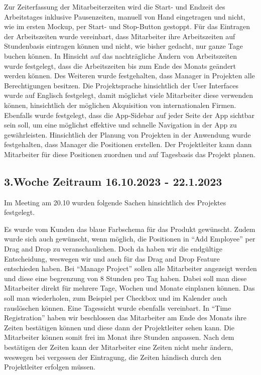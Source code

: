 \documentclass{article}
\begin{document}
Zur Zeiterfassung der Mitarbeiterzeiten wird die Start- und Endzeit des
Arbeitstages inklusive Pausenzeiten, manuell von Hand eingetragen und nicht,
wie im ersten Mockup, per Start- und Stop-Button gestoppt. Für das Eintragen
der Arbeitszeiten wurde vereinbart, dass Mitarbeiter ihre Arbeitszeiten auf
Stundenbasis eintragen können und nicht, wie bisher gedacht, nur ganze Tage
buchen können. In Hinsicht auf das nachträgliche Ändern von Arbeitszeiten wurde
festgelegt, dass die Arbeitszeiten bis zum Ende des Monats geändert werden
können. Des Weiteren wurde festgehalten, dass Manager in Projekten alle
Berechtigungen besitzen. Die Projektsprache hinsichtlich der User Interfaces
wurde auf Englisch festgelegt, damit möglichst viele Mitarbeiter diese
verwenden können, hinsichtlich der möglichen Akquisition von internationalen
Firmen. Ebenfalls wurde festgelegt, dass die App-Sidebar auf jeder Seite der
App sichtbar sein soll, um eine möglichst effektive und schnelle Navigation in
der App zu gewährleisten. Hinsichtlich der Planung von Projekten in der
Anwendung wurde festgehalten, dass Manager die Positionen erstellen. Der
Projektleiter kann dann Mitarbeiter für diese Positionen zuordnen und auf
Tagesbasis das Projekt planen.

\subsection{3.Woche Zeitraum 16.10.2023 - 22.1.2023}
Im Meeting am 20.10 wurden folgende Sachen hinsichtlich des Projektes
festgelegt.

Es wurde vom Kunden das blaue Farbschema für das Produkt gewünscht. Zudem wurde
sich auch gewünscht, wenn möglich, die Positionen in “Add Employee” per Drag
and Drop zu veranschaulichen. Doch da haben wir die endgültige Entscheidung,
weswegen wir und auch für das Drag and Drop Feature entschieden haben. Bei
“Manage Project” sollen alle Mitarbeiter angezeigt werden und diese eine
begrenzung von 8 Stunden pro Tag haben. Dabei soll man diese Mitarbeiter direkt
für mehrere Tage, Wochen und Monate einplanen können. Das soll man wiederholen,
zum Beispiel per Checkbox und im Kalender auch rauslöschen können. Eine
Tagessicht wurde ebenfalls vereinbart. In “Time Registration” haben wir
beschlossen das Mitarbeiter am Ende des Monats ihre Zeiten bestätigen können
und diese dann der Projektleiter sehen kann. Die Mitarbeiter können somit frei
im Monat ihre Stunden anpassen. Nach dem bestätigen der Zeiten kann der
Mitarbeiter eine Zeiten nicht mehr ändern, weswegen bei vergessen der
Eintragung, die Zeiten händisch durch den Projektleiter erfolgen müssen.
\end{document}
